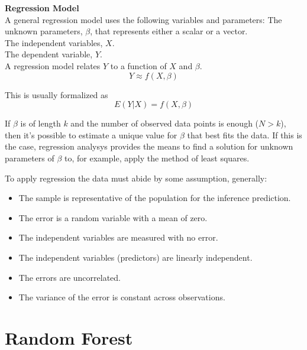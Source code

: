 \textbf{Regression Model} \\
A general regression model uses the following variables and parameters:
The unknown parameters, $\beta$, that represents either a scalar or a vector.\\
The independent variables, $X$. \\
The dependent variable, $Y$.\\

A regression model relates $Y$ to a function of $X$ and $\beta$.
\begin{equation}
	Y \approx f(X,\beta)
\end{equation}

This is usually formalized as
\begin{equation}
	E(Y|X) = f(X,\beta)
\end{equation}

If $\beta$ is of length $k$ and the number of observed data points is enough ($N > k$), then it's possible to estimate a unique value for $\beta$ that best fits the data. If this is the case, regression analysys provides the means to find a solution for unknown parameters of $\beta$ to, for example, apply the method of least squares.

To apply regression the data must abide by some assumption, generally:
\begin{itemize}[noitemsep, topsep = -5pt]
	\item The sample is representative of the population for the inference prediction.
	\item The error is a random variable with a mean of zero.
	\item The independent variables are measured with no error.
	\item The independent variables (predictors) are linearly independent.
	\item The errors are uncorrelated.
	\item The variance of the error is constant across observations.
\end{itemize}














\pagebreak

\section{Random Forest}

